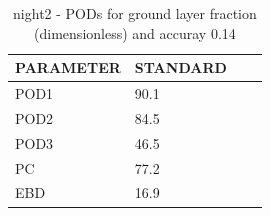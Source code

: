 \begin{table}[p!]
\begin{center}
\begin{tabular}{|l|l|l|l|}
\hline
\multicolumn{1}{|c|}{\cellcolor[HTML]{C0C0C0}\textbf{PARAMETER}} & \multicolumn{1}{c|}{\cellcolor[HTML]{C0C0C0}\textbf{STANDARD}} \\
\hline
\cellcolor[HTML]{C0C0C0}POD1  & 90.1                                \\
\cellcolor[HTML]{C0C0C0}POD2  & 84.5                                \\
\cellcolor[HTML]{C0C0C0}POD3  & 46.5                                \\
\cellcolor[HTML]{C0C0C0}PC    & 77.2                                  \\
\cellcolor[HTML]{C0C0C0}EBD   & 16.9                                 \\
\hline
\end{tabular}
\caption{night2 - PODs for ground layer fraction (dimensionless) and accuray 0.14}
\label{tab:podglf0.14:night2}
\end{center}
\end{table}
